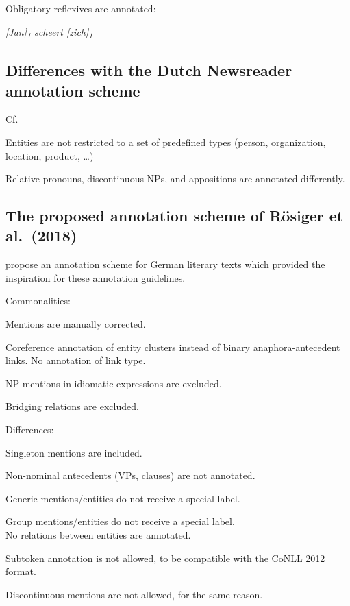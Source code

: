 \begin{itemize*}
\begin{itemize*}
    \end{itemize*}

\item Obligatory reflexives are annotated:

    \emph{{[}Jan{]}\textsubscript{1} scheert
  {[}zich{]}\textsubscript{1}}

\end{itemize*}


\subsection{Differences with the Dutch Newsreader annotation scheme}
Cf. \citet{schoen2014newsreader}
\begin{itemize*}
\item Entities are not restricted to a set of predefined types
    (person, organization, location, product, \dots)
\item Relative pronouns, discontinuous NPs, and appositions are annotated
  differently.
\end{itemize*}

\subsection{The proposed annotation scheme of R\"osiger et al.~(2018)}
\citet{roesiger2018literary} propose an annotation scheme for German literary texts
which provided the inspiration for these annotation guidelines.

Commonalities:
\begin{itemize*}
\item Mentions are manually corrected.
\item Coreference annotation of entity clusters
    instead of binary anaphora-antecedent links.
    No annotation of link type.
\item NP mentions in idiomatic expressions are excluded.
\item Bridging relations are excluded.
\end{itemize*}

\filbreak
Differences:
\begin{itemize*}
\item Singleton mentions are included.
\item Non-nominal antecedents (VPs, clauses) are not annotated.
\item Generic mentions/entities do not receive a special label.
\item Group mentions/entities do not receive a special label.\\
    No relations between entities are annotated.
\item Subtoken annotation is not allowed, to be compatible with the CoNLL 2012 format.
\item Discontinuous mentions are not allowed, for the same reason.
\end{itemize*}






